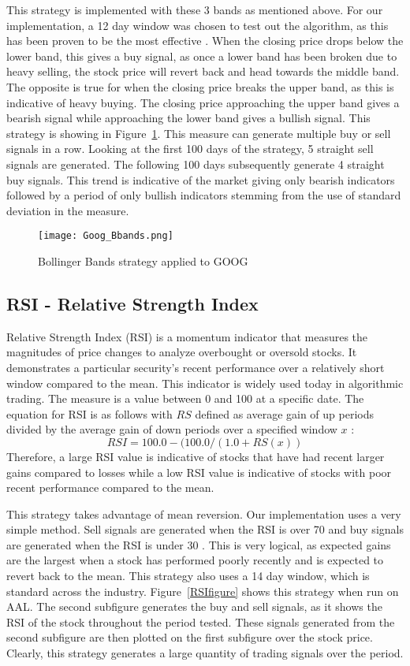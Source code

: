 \documentclass[../thesis.tex]{subfiles}
\begin{document}
This strategy is implemented with these 3 bands as mentioned above. For our implementation, a 12 day window was chosen to test out the algorithm, as this has been proven to be the most effective \cite{Liu2006}. When the closing price drops below the lower band, this gives a buy signal, as once a lower band has been broken due to heavy selling, the stock price will revert back and head towards the middle band. The opposite is true for when the closing price breaks the upper band, as this is indicative of heavy buying. The closing price approaching the upper band gives a bearish signal while approaching the lower band gives a bullish signal.  This strategy is showing in Figure~\ref{BBANDSfigure}. This measure can generate multiple buy or sell signals in a row. Looking at the first 100 days of the strategy, 5 straight sell signals are generated. The following 100 days subsequently generate 4 straight buy signals. This trend is indicative of the market giving only bearish indicators followed by a period of only bullish indicators stemming from the use of standard deviation in the measure.

\begin{figure}[h]
\centering
\texttt{[image: Goog\_Bbands.png]}
\caption{Bollinger Bands strategy applied to GOOG  \label{overflow}}
\label{BBANDSfigure}
\end{figure}

\subsection{RSI - Relative Strength Index}

Relative Strength Index (RSI) is a momentum indicator that measures the magnitudes of price changes to analyze overbought or oversold stocks. It demonstrates a particular security's recent performance over a relatively short window compared to the mean. This indicator is widely used today in algorithmic trading. The measure is a value between 0 and 100 at a specific date. The equation for RSI is as follows with $RS$ defined as average gain of up periods divided by the average gain of down periods over a specified window $x$ \cite{Chong2014}: \[RSI = 100.0 - (100.0 / (1.0 + RS(x))\] Therefore, a large RSI value is indicative of stocks that have had recent larger gains compared to losses while a low RSI value is indicative of stocks with poor recent performance compared to the mean.

This strategy takes advantage of mean reversion. Our implementation uses a very simple method. Sell signals are generated when the RSI is over 70 and buy signals are generated when the RSI is under 30 \cite{Chong2014}. This is very logical, as expected gains are the largest when a stock has performed poorly recently and is expected to revert back to the mean. This strategy also uses a 14 day window, which is standard across the industry. Figure~\ref{RSIfigure} shows this strategy when run on AAL. The second subfigure generates the buy and sell signals, as it shows the RSI of the stock throughout the period tested. These signals generated from the second subfigure are then plotted on the first subfigure over the stock price. Clearly, this strategy generates a large quantity of trading signals over the period.
\end{document}
